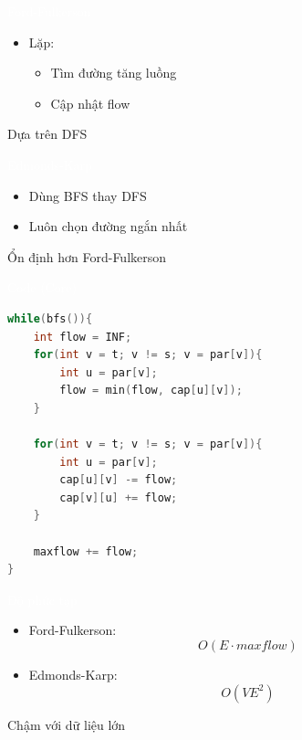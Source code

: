 \documentclass{beamer}
\newcommand{\hlblue}[1]{\textcolor{myblue}{#1}}
\newcommand{\hlgreen}[1]{\textcolor{mygreen}{#1}}
\newcommand{\hlred}[1]{\textcolor{myred}{#1}}
\newcommand{\hlpurple}[1]{\textcolor{mypurple}{#1}}
\newcommand{\hlwhite}[1]{\textcolor{white}{#1}}
\begin{document}
\begin{frame}{\hlwhite{Ford-Fulkerson}}
\begin{itemize}
\item Lặp:
\begin{itemize}
\item Tìm đường tăng luồng
\item Cập nhật flow
\end{itemize}
\end{itemize}

\begin{tcolorbox}
\centering
\hlpurple{Dựa trên DFS}
\end{tcolorbox}
\end{frame}


\begin{frame}{\hlwhite{Edmonds-Karp}}
\begin{itemize}
\item Dùng \hlblue{BFS} thay DFS
\item Luôn chọn đường ngắn nhất
\end{itemize}

\begin{tcolorbox}
\centering
\hlgreen{Ổn định hơn Ford-Fulkerson}
\end{tcolorbox}
\end{frame}


\begin{frame}[fragile]{\hlwhite{Code (Core)}}
\begin{lstlisting}[language=C++]
while(bfs()){
    int flow = INF;
    for(int v = t; v != s; v = par[v]){
        int u = par[v];
        flow = min(flow, cap[u][v]);
    }

    for(int v = t; v != s; v = par[v]){
        int u = par[v];
        cap[u][v] -= flow;
        cap[v][u] += flow;
    }

    maxflow += flow;
}
\end{lstlisting}
\end{frame}


\begin{frame}{\hlwhite{Độ phức tạp}}
\begin{itemize}
\item Ford-Fulkerson:
\[
O(E \cdot maxflow)
\]

\item Edmonds-Karp:
\[
O(VE^2)
\]
\end{itemize}

\begin{tcolorbox}
\centering
\hlred{Chậm với dữ liệu lớn}
\end{tcolorbox}
\end{frame}
\end{document}
